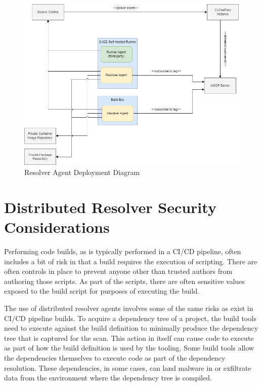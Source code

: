 \begin{figure}[ht]
  \includegraphics[width=\textwidth]{graphics/cxoneflow-diagrams-Resolver Agent Diagram.png}
  \caption{Resolver Agent Deployment Diagram}
  \label{fig:resolver-agent-diagram}
\end{figure}


\section{Distributed Resolver Security Considerations}\label{sec:dist-resolver-security-considerations}

Performing code builds, as is typically performed in a CI/CD pipeline, often includes
a bit of risk in that a build requires the execution of scripting.  There are often
controls in place to prevent anyone other than trusted authors from authoring those scripts.
As part of the scripts, there are often sensitive values exposed to the build script
for purposes of executing the build.

The use of distributed resolver agents involves some of the same risks as exist in
CI/CD pipeline builds.  To acquire a dependency tree of a project, the build tools
need to execute against the build definition to minimally produce the dependency
tree that is captured for the scan.  This action in itself can cause code to execute
as part of how the build definition is used by the tooling.  Some build tools allow
the dependencies themselves to execute code as part of the dependency resolution.
These dependencies, in some cases, can land malware in or exfiltrate data from the
environment where the dependency tree is compiled.

